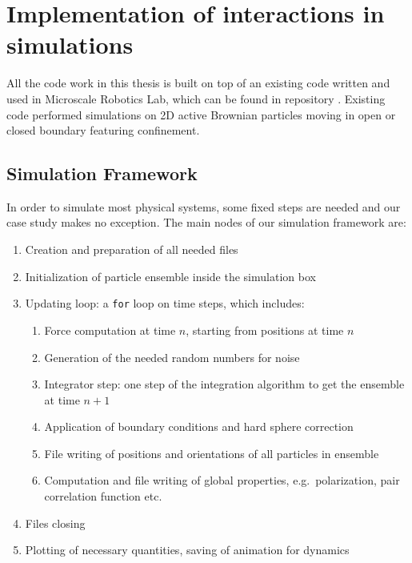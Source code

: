 \documentclass[../../master_thesis_np.tex]{subfiles}
\begin{document}
\chapter[Interaction Implementation]{Implementation of interactions in simulations}
\label{chap:int_impl}

	All the code work in this thesis is built on top of an existing code written and used in Microscale Robotics Lab, which can be found in repository \cite{sharma_simulations_2023}.
    Existing code performed simulations on 2D active Brownian particles moving in open or closed boundary featuring confinement. 
	
	\section{Simulation Framework}
	In order to simulate most physical systems, some fixed steps are needed and our case study makes no exception. 
	The main nodes of our simulation framework are:
	\begin{enumerate}
		\item Creation and preparation of all needed files
		\item Initialization of particle ensemble inside the simulation box
		\item Updating loop: a \verb|for| loop on time steps, which includes:
		\begin{enumerate}
			\item Force computation at time $n$, starting from positions at time $n$
			\item Generation of the needed random numbers for noise
			\item Integrator step: one step of the integration algorithm to get the ensemble at time $n+1$
			\item Application of boundary conditions and hard sphere correction 
			\item File writing of positions and orientations of all particles in ensemble 
			\item Computation and file writing of global properties, e.g.\ polarization, pair correlation function etc.	
		\end{enumerate}
		\item Files closing
		\item Plotting of necessary quantities, saving of animation for dynamics
	\end{enumerate}
	
\end{document}
